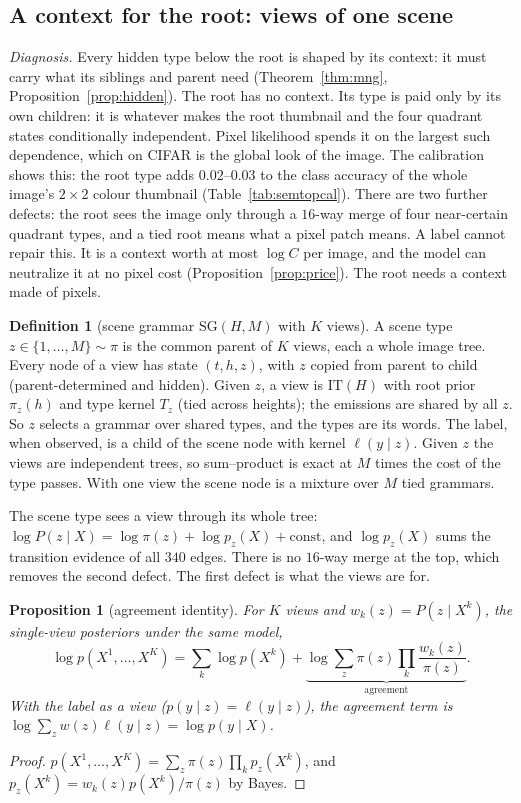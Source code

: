 \documentclass[11pt]{article}
\newtheorem{proposition}[theorem]{Proposition}
\theoremstyle{definition}
\newtheorem{definition}[theorem]{Definition}
\begin{document}
\subsection{A context for the root: views of one scene}\label{sec:views}
\emph{Diagnosis.} Every hidden type below the root is shaped by its context: it must carry what its siblings and
parent need (Theorem~\ref{thm:mng}, Proposition~\ref{prop:hidden}). The root has no context. Its type is paid only
by its own children: it is whatever makes the root thumbnail and the four quadrant states conditionally independent.
Pixel likelihood spends it on the largest such dependence, which on CIFAR is the global look of the image. The
calibration shows this: the root type adds $0.02$--$0.03$ to the class accuracy of the whole image's $2\times2$ colour
thumbnail (Table~\ref{tab:semtopcal}). There are two further defects: the root sees the image only through a
$16$-way merge of four near-certain quadrant types, and a tied root means what a pixel patch means. A label cannot
repair this. It is a context worth at most $\log C$ per image, and the model can neutralize it at no pixel cost
(Proposition~\ref{prop:price}). The root needs a context made of pixels.

\begin{definition}[scene grammar $\mathrm{SG}(H,M)$ with $K$ views]\label{def:sg}
A scene type $z\in\{1,\dots,M\}\sim\pi$ is the common parent of $K$ views, each a whole image tree. Every node of a view
has state $(t,h,z)$, with $z$ copied from parent to child (parent-determined and hidden). Given $z$, a view is
$\mathrm{IT}(H)$ with root prior $\pi_z(h)$ and type kernel $T_{z}$ (tied across heights); the emissions are shared by all
$z$. So $z$ selects a grammar over shared types, and the types are its words. The label, when observed, is a child of the
scene node with kernel $\ell(y\mid z)$. Given $z$ the views are independent trees, so sum--product is exact at $M$ times
the cost of the type passes. With one view the scene node is a mixture over $M$ tied grammars.
\end{definition}

\noindent The scene type sees a view through its whole tree: $\log P(z\mid X)=\log\pi(z)+\log p_z(X)+\mathrm{const}$, and
$\log p_z(X)$ sums the transition evidence of all $340$ edges. There is no $16$-way merge at the top, which removes the
second defect. The first defect is what the views are for.

\begin{proposition}[agreement identity]\label{prop:agree}
For $K$ views and $w_k(z)=P(z\mid X^k)$, the single-view posteriors under the same model,
\[
\log p(X^1,\dots,X^K)=\sum_k\log p(X^k)+\underbrace{\log\sum_z\pi(z)\prod_k\frac{w_k(z)}{\pi(z)}}_{\text{agreement}} .
\]
With the label as a view ($p(y\mid z)=\ell(y\mid z)$), the agreement term is $\log\sum_zw(z)\ell(y\mid z)=\log p(y\mid X)$.
\end{proposition}
\begin{proof}
$p(X^1,\dots,X^K)=\sum_z\pi(z)\prod_kp_z(X^k)$, and $p_z(X^k)=w_k(z)p(X^k)/\pi(z)$ by Bayes.
\end{proof}
\end{document}
